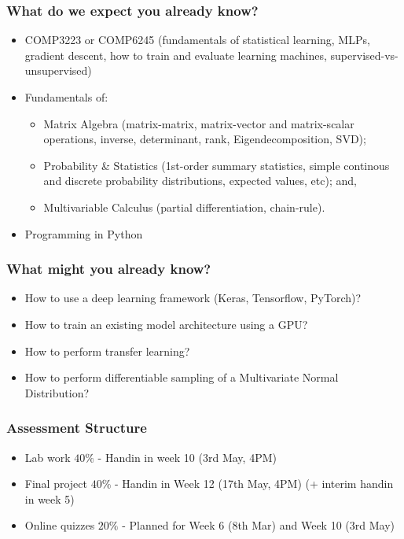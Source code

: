 \documentclass[\beamerclass]{beamer}
\begin{document}
\begin{frame}
	\frametitle{What do we expect you already know?}
	
	\begin{itemize}
	\item<+-> COMP3223 or COMP6245 (fundamentals of statistical learning, MLPs, gradient descent, how to train and evaluate learning machines, supervised-vs-unsupervised)
	\item<+-> Fundamentals of:
	\begin{itemize}
		\item Matrix Algebra (matrix-matrix, matrix-vector and matrix-scalar operations, inverse, determinant, rank, Eigendecomposition, SVD);
		\item Probability \& Statistics (1st-order summary statistics, simple continous and discrete probability distributions, expected values, etc); and, 
		\item Multivariable Calculus (partial differentiation, chain-rule).
	\end{itemize}
	\item<+-> Programming in Python
	\end{itemize}
\end{frame}

\begin{frame}
	\frametitle{What might you already know?}	
	\begin{itemize}
	\item<+-> How to use a deep learning framework (Keras, Tensorflow, PyTorch)?
	\item<+-> How to train an existing model architecture using a GPU?
	\item<+-> How to perform transfer learning?
	\item<+-> How to perform differentiable sampling of a Multivariate Normal Distribution?
	\end{itemize}
\end{frame}

\begin{frame}
	\frametitle{Assessment Structure}
	\begin{itemize}
		\item Lab work $40\%$ - Handin in week 10 (3rd May, 4PM)
		\item Final project $40\%$  - Handin in Week 12 (17th May, 4PM) (+ interim handin in week 5)
		\item Online quizzes $20\%$ - Planned for Week 6 (8th Mar) and Week 10 (3rd May) 
	\end{itemize}
\end{frame}
\end{document}
